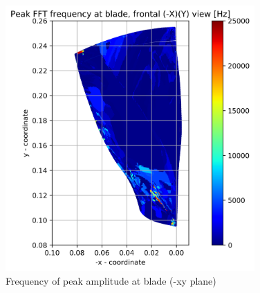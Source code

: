 \begin{figure}[ht]
	\centering
	\includegraphics[width=0.85\textwidth]{Figures/blade-negxy-peak-freq.png}
	\caption{Frequency of peak amplitude at blade (-xy plane)} \label{blade-negxy-peak-freq}
\end{figure}

